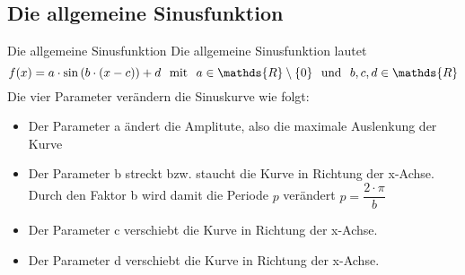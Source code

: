 \subsection{Die allgemeine Sinusfunktion}
\begin{b8d}{Die allgemeine Sinusfunktion}{}
    Die allgemeine Sinusfunktion lautet $$f(x)= a\cdot \sin{(b\cdot (x - c))}+d \hspace{0.25cm} \text{mit} \hspace{0.25cm} a\in \mathds{R}\setminus\{0\} \hspace{0.25cm} \text{und} \hspace{0.25cm} b,c,d \in \mathds{R}$$
    Die vier Parameter verändern die Sinuskurve wie folgt:
    \begin{itemize}
        \item Der Parameter a ändert die Amplitute, also die maximale Auslenkung der Kurve
        \item Der Parameter b streckt bzw. staucht die Kurve in Richtung der x-Achse. Durch den Faktor b wird damit die Periode $p$ verändert $p = \dfrac{2\cdot \pi}{b}$
        \item Der Parameter c verschiebt die Kurve in Richtung der x-Achse.
        \item Der Parameter d verschiebt die Kurve in Richtung der x-Achse.
    \end{itemize}
\end{b8d}
\begin{center}
\end{center}